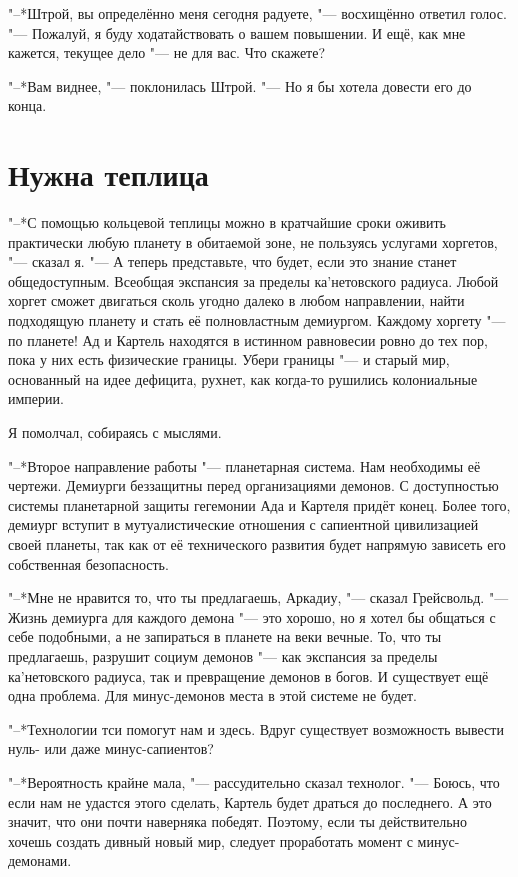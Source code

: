 \documentclass[a4paper,10pt,fleqn]{book}
\begin{document}
"--*Штрой, вы определённо меня сегодня радуете, "--- восхищённо ответил голос.
"--- Пожалуй, я буду ходатайствовать о вашем повышении.
И ещё, как мне кажется, текущее дело "--- не для вас.
Что скажете?

"--*Вам виднее, "--- поклонилась Штрой.
"--- Но я бы хотела довести его до конца.

\section{Нужна теплица}

"--*С помощью кольцевой теплицы можно в кратчайшие сроки оживить практически любую планету в обитаемой зоне, не пользуясь услугами хоргетов, "--- сказал я.
"--- А теперь представьте, что будет, если это знание станет общедоступным.
Всеобщая экспансия за пределы ка'нетовского радиуса.
Любой хоргет сможет двигаться сколь угодно далеко в любом направлении, найти подходящую планету и стать её полновластным демиургом.
Каждому хоргету "--- по планете!
Ад и Картель находятся в истинном равновесии ровно до тех пор, пока у них есть физические границы.
Убери границы "--- и старый мир, основанный на идее дефицита, рухнет, как когда-то рушились колониальные империи.

Я помолчал, собираясь с мыслями.

"--*Второе направление работы "--- планетарная система.
Нам необходимы её чертежи.
Демиурги беззащитны перед организациями демонов.
С доступностью системы планетарной защиты гегемонии Ада и Картеля придёт конец.
Более того, демиург вступит в мутуалистические отношения с сапиентной цивилизацией своей планеты, так как от её технического развития будет напрямую зависеть его собственная безопасность.

"--*Мне не нравится то, что ты предлагаешь, Аркадиу, "--- сказал Грейсвольд.
"--- Жизнь демиурга для каждого демона "--- это хорошо, но я хотел бы общаться с себе подобными, а не запираться в планете на веки вечные.
То, что ты предлагаешь, разрушит социум демонов "--- как экспансия за пределы ка'нетовского радиуса, так и превращение демонов в богов.
И существует ещё одна проблема.
Для минус-демонов места в этой системе не будет.

"--*Технологии тси помогут нам и здесь.
Вдруг существует возможность вывести нуль- или даже минус-сапиентов?

"--*Вероятность крайне мала, "--- рассудительно сказал технолог.
"--- Боюсь, что если нам не удастся этого сделать, Картель будет драться до последнего.
А это значит, что они почти наверняка победят.
Поэтому, если ты действительно хочешь создать дивный новый мир, следует проработать момент с минус-демонами.
\end{document}
